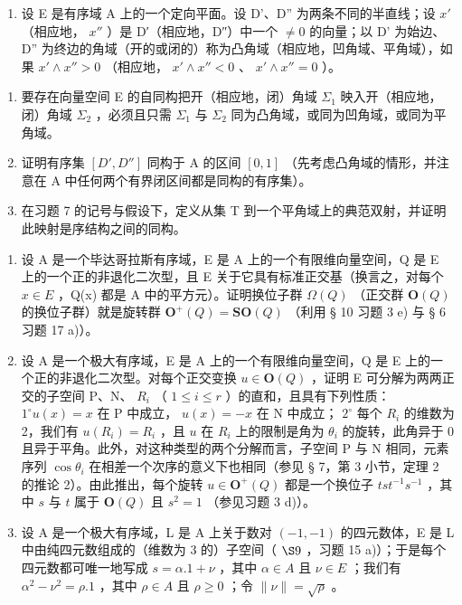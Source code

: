 \begin{enumerate}
\def\labelenumi{\arabic{enumi})}
\setcounter{enumi}{7}
\tightlist
\item
  设 E 是有序域 A 上的一个定向平面。设 D'、D'' 为两条不同的半直线；设 \(x'\) （相应地， \(x''\) ）是 D′（相应地，D″）中一个 \(\neq 0\) 的向量；以 D' 为始边、D'' 为终边的角域（开的或闭的）称为凸角域（相应地，凹角域、平角域），如果 \(x' \wedge x'' > 0\) （相应地， \(x' \wedge x'' < 0\) 、 \(x' \wedge x'' = 0\) ）。
\end{enumerate}

\begin{enumerate}
\def\labelenumi{\alph{enumi})}
\item
  要存在向量空间 E 的自同构把开（相应地，闭）角域 \(\Sigma_{1}\) 映入开（相应地，闭）角域 \(\Sigma_{2}\) ，必须且只需 \(\Sigma_{1}\) 与 \(\Sigma_{2}\) 同为凸角域，或同为凹角域，或同为平角域。
\item
  证明有序集 \(\left[D', D''\right]\) 同构于 A 的区间 \(\left[0,1\right]\) （先考虑凸角域的情形，并注意在 A 中任何两个有界闭区间都是同构的有序集）。
\item
  在习题 7 的记号与假设下，定义从集 T 到一个平角域上的典范双射，并证明此映射是序结构之间的同构。
\end{enumerate}

\begin{enumerate}
\def\labelenumi{\arabic{enumi})}
\setcounter{enumi}{8}
\item
  设 A 是一个毕达哥拉斯有序域，E 是 A 上的一个有限维向量空间，Q 是 E 上的一个正的非退化二次型，且 E 关于它具有标准正交基（换言之，对每个 \(x \in E\) ，Q(x) 都是 A 中的平方元）。证明换位子群 \(\Omega(Q)\) （正交群 \(\mathbf{O}(Q)\) 的换位子群）就是旋转群 \(\mathbf{O}^{+}(Q) = \mathbf{S}\mathbf{O}(Q)\) （利用 § 10 习题 3 e) 与 § 6 习题 17 a)）。
\item
  设 A 是一个极大有序域，E 是 A 上的一个有限维向量空间，Q 是 E 上的一个正的非退化二次型。对每个正交变换 \(u \in \mathbf{O}(Q)\) ，证明 E 可分解为两两正交的子空间 P、N、 \(R_i\) （ \(1 \leqslant i \leqslant r\) ）的直和，且具有下列性质： \(1^\circ u(x) = x\) 在 P 中成立， \(u(x) = -x\) 在 N 中成立； \(2^\circ\) 每个 \(R_i\) 的维数为 2，我们有 \(u(R_i) = R_i\) ，且 \(u\) 在 \(R_i\) 上的限制是角为 \(\theta_i\) 的旋转，此角异于 0 且异于平角。此外，对这种类型的两个分解而言，子空间 P 与 N 相同，元素序列 \(\cos \theta_i\) 在相差一个次序的意义下也相同（参见 § 7，第 3 小节，定理 2 的推论 2）。由此推出，每个旋转 \(u \in \mathbf{O}^+(Q)\) 都是一个换位子 \(tst^{-1}s^{-1}\) ，其中 \(s\) 与 \(t\) 属于 \(\mathbf{O}(Q)\) 且 \(s^2 = 1\) （参见习题 3 d)）。
\item
  设 A 是一个极大有序域，L 是 A 上关于数对 \((-1,-1)\) 的四元数体，E 是 L 中由纯四元数组成的（维数为 3 的）子空间（ \(\S 9\) ，习题 15 a)）；于是每个四元数都可唯一地写成 \(s=\alpha.1+\nu\) ，其中 \(\alpha\in A\) 且 \(\nu\in E\) ；我们有 \(\alpha^{2}-\nu^{2}=\rho.1\) ，其中 \(\rho\in A\) 且 \(\rho\geqslant0\) ；令 \(\|\nu\|=\sqrt{\rho}\) 。
\end{enumerate}

